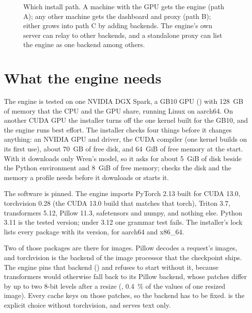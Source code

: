 \begin{figure}[htbp]
\centering

\caption[Which install path]{Which install path. A machine with the GPU gets the engine (path A); any other machine gets the dashboard and proxy (path B); either grows into path C by adding backends. The engine's own server can relay to other backends, and a standalone proxy can list the engine as one backend among others.}\label{fig:install-paths}
\end{figure}

\section{What the engine needs}

The engine is tested on one NVIDIA DGX Spark, a GB10 GPU () with 128~GB of memory that the CPU and the GPU share, running Linux on aarch64. On another CUDA GPU the installer turns off the one kernel built for the GB10, and the engine runs best effort. The installer checks four things before it changes anything: an NVIDIA GPU and driver, the CUDA compiler (one kernel builds on its first use), about 70~GB of free disk, and 64~GiB of free memory at the start. With  it downloads only Wren's model, so it asks for about 5~GiB of disk beside the Python environment and 8~GiB of free memory;  checks the disk and the memory a profile needs before it downloads or starts it.

The software is pinned. The engine imports PyTorch 2.13 built for CUDA 13.0, torchvision 0.28 (the CUDA 13.0 build that matches that torch), Triton 3.7, transformers 5.12, Pillow 11.3, safetensors and numpy, and nothing else. Python 3.11 is the tested version; under 3.12 one grammar test fails. The installer's lock lists every package with its version, for aarch64 and x86\_64.

Two of those packages are there for images. Pillow decodes a request's images, and torchvision is the backend of the image processor that the checkpoint ships. The engine pins that backend () and refuses to start without it, because transformers would otherwise fall back to its Pillow backend, whose patches differ by up to two 8-bit levels after a resize (\measured, 0.4~\% of the values of one resized image). Every cache keys on those patches, so the backend has to be fixed.  is the explicit choice without torchvision, and  serves text only.

